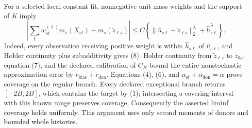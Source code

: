 For a selected local-constant fit, nonnegative unit-mass weights and the support of \(K\) imply
\[
 \left|\sum_tw_{st}^{(\ell)}m_s(X_{st})-
 m_s(\widetilde z_{\ell s})\right|
 \le C\left\{
 \|\widehat u_{s\ell}-\widetilde z_{\ell s}\|_2^\lambda
 +\widehat h_{s\ell}^\lambda\right\}.                    \tag{8}
\]
Indeed, every observation receiving positive weight is within \(\widehat h_{s\ell}\) of \(\widehat u_{s\ell}\), and Holder continuity plus subadditivity gives (8).  Holder continuity from \(\widetilde z_{\ell s}\) to \(z_{0s}\), equation (7), and the declared calibration of \(C_H\) bound the entire nonstochastic approximation error by \(r_{\mathrm{bias}}+r_{\mathrm{don}}\).  Equations (4), (6), and
\(\alpha_{\mathrm{st}}+\alpha_{\mathrm{don}}=\alpha\) prove coverage on the regular branch.  Every declared exceptional branch returns \([-2B,2B]\), which contains the target by (1); intersecting a covering interval with this known range preserves coverage.  Consequently the asserted liminf coverage holds uniformly.  This argument uses only second moments of donors and bounded whole histories.


